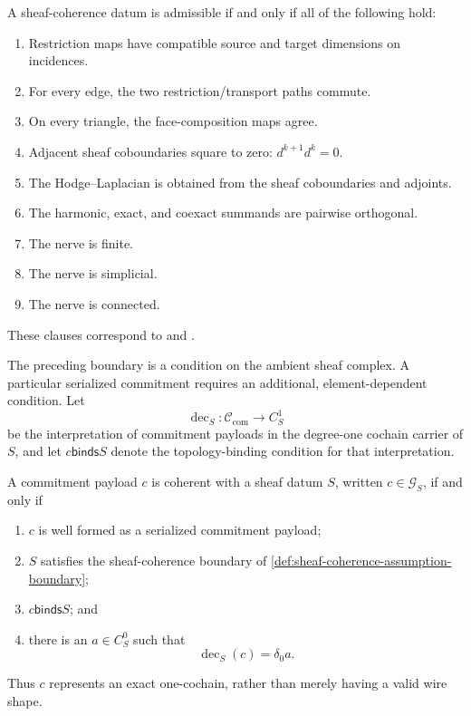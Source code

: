 \begin{definition}\label{def:sheaf-coherence-assumption-boundary}
  A sheaf-coherence datum is admissible if and only if all of the following
  hold:
  \begin{enumerate}[label=(\roman*)]
    \item Restriction maps have compatible source and target dimensions on
      incidences.
    \item For every edge, the two restriction/transport paths commute.
    \item On every triangle, the face-composition maps agree.
    \item Adjacent sheaf coboundaries square to zero:
      \(d^{k+1}d^k=0\).
    \item The Hodge--Laplacian is obtained from the sheaf coboundaries and
      adjoints.
    \item The harmonic, exact, and coexact summands are pairwise orthogonal.
    \item The nerve is finite.
    \item The nerve is simplicial.
    \item The nerve is connected.
  \end{enumerate}
  These clauses correspond to  and
  .
\end{definition}

The preceding boundary is a condition on the ambient sheaf complex.  A
particular serialized commitment requires an additional, element-dependent
condition.  Let
\[
  \operatorname{dec}_S:\mathcal C_{\mathrm{com}}\longrightarrow C_S^1
\]
be the interpretation of commitment payloads in the degree-one cochain carrier
of \(S\), and let \(c\mathrel{\mathsf{binds}}S\) denote the topology-binding
condition for that interpretation.

\begin{definition}\label{def:committed-one-cochain-coherence}
  A commitment payload \(c\) is coherent with a sheaf datum \(S\), written
  \(c\in\mathcal G_S\), if and only if
  \begin{enumerate}[label=(\roman*)]
    \item \(c\) is well formed as a serialized commitment payload;
    \item \(S\) satisfies the sheaf-coherence boundary of
      \cref{def:sheaf-coherence-assumption-boundary};
    \item \(c\mathrel{\mathsf{binds}}S\); and
    \item there is an \(a\in C_S^0\) such that
      \[
        \operatorname{dec}_S(c)=\delta_0 a.
      \]
  \end{enumerate}
  Thus \(c\) represents an exact one-cochain, rather than merely having a
  valid wire shape.
\end{definition}

